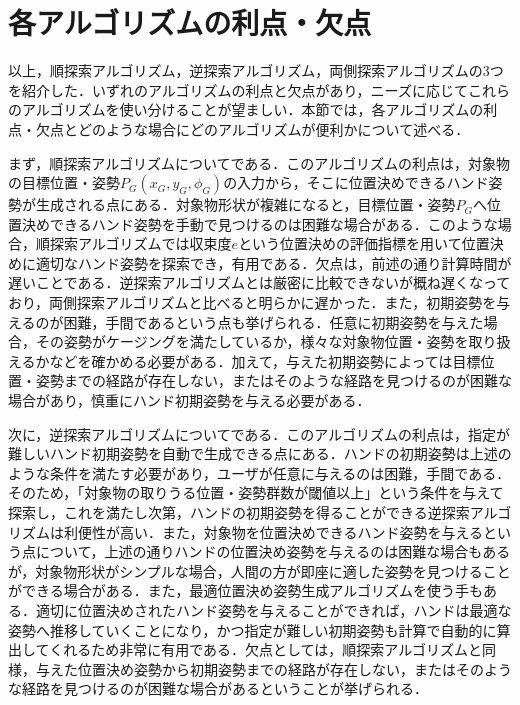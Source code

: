 \documentclass[a4paper,twoside,12pt,papersize, dvipdfmx]{iirthesis}
\begin{document}
\section{各アルゴリズムの利点・欠点}
以上，順探索アルゴリズム，逆探索アルゴリズム，両側探索アルゴリズムの3つを紹介した．いずれのアルゴリズムの利点と欠点があり，ニーズに応じてこれらのアルゴリズムを使い分けることが望ましい．本節では，各アルゴリズムの利点・欠点とどのような場合にどのアルゴリズムが便利かについて述べる．\par

まず，順探索アルゴリズムについてである．このアルゴリズムの利点は，対象物の目標位置・姿勢$P_{G} (x_{G}, y_{G}, \phi_{G})$の入力から，そこに位置決めできるハンド姿勢が生成される点にある．対象物形状が複雑になると，目標位置・姿勢$P_G$へ位置決めできるハンド姿勢を手動で見つけるのは困難な場合がある．このような場合，順探索アルゴリズムでは収束度$e$という位置決めの評価指標を用いて位置決めに適切なハンド姿勢を探索でき，有用である．欠点は，前述の通り計算時間が遅いことである．逆探索アルゴリズムとは厳密に比較できないが概ね遅くなっており，両側探索アルゴリズムと比べると明らかに遅かった．また，初期姿勢を与えるのが困難，手間であるという点も挙げられる．任意に初期姿勢を与えた場合，その姿勢がケージングを満たしているか，様々な対象物位置・姿勢を取り扱えるかなどを確かめる必要がある．加えて，与えた初期姿勢によっては目標位置・姿勢までの経路が存在しない，またはそのような経路を見つけるのが困難な場合があり，慎重にハンド初期姿勢を与える必要がある．\par

次に，逆探索アルゴリズムについてである．このアルゴリズムの利点は，指定が難しいハンド初期姿勢を自動で生成できる点にある．ハンドの初期姿勢は上述のような条件を満たす必要があり，ユーザが任意に与えるのは困難，手間である．そのため，「対象物の取りうる位置・姿勢群数が閾値以上」という条件を与えて探索し，これを満たし次第，ハンドの初期姿勢を得ることができる逆探索アルゴリズムは利便性が高い．また，対象物を位置決めできるハンド姿勢を与えるという点について，上述の通りハンドの位置決め姿勢を与えるのは困難な場合もあるが，対象物形状がシンプルな場合，人間の方が即座に適した姿勢を見つけることができる場合がある．また，最適位置決め姿勢生成アルゴリズムを使う手もある．適切に位置決めされたハンド姿勢を与えることができれば，ハンドは最適な姿勢へ推移していくことになり，かつ指定が難しい初期姿勢も計算で自動的に算出してくれるため非常に有用である．欠点としては，順探索アルゴリズムと同様，与えた位置決め姿勢から初期姿勢までの経路が存在しない，またはそのような経路を見つけるのが困難な場合があるということが挙げられる．\par
\end{document}
